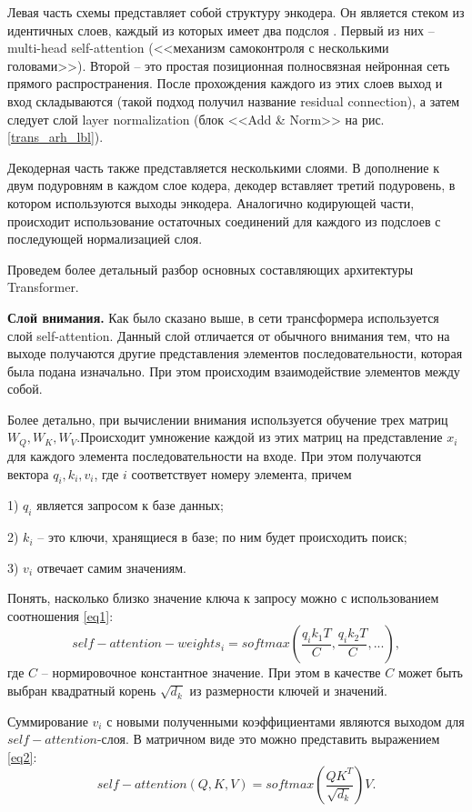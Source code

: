 \documentclass[14pt,a4paper]{extarticle}
\begin{document}
Левая часть схемы представляет собой структуру энкодера. Он является стеком из идентичных слоев, каждый из которых имеет два подслоя \cite{transform}. Первый из них --  multi-head self-attention (<<механизм самоконтроля с несколькими головами>>). Второй -- это простая позиционная полносвязная нейронная сеть прямого распространения. После прохождения каждого из этих слоев выход и вход складываются (такой подход получил название residual connection), а затем следует слой layer normalization (блок <<Add \& Norm>> на рис. \ref{trans_arh_lbl}).

Декодерная часть также представляется несколькими слоями. В дополнение к двум
подуровням в каждом слое кодера, декодер вставляет третий подуровень, в котором используются выходы энкодера. Аналогично кодирующей части, происходит использование остаточных соединений
для каждого из подслоев с последующей нормализацией слоя. 

Проведем более детальный разбор основных составляющих архитектуры Transformer.

\textbf{Слой внимания.} Как было сказано выше, в сети трансформера используется слой self-attention\cite{Attention}. Данный слой отличается от обычного внимания тем, что на выходе получаются другие представления элементов последовательности, которая была подана изначально. При этом происходим взаимодействие элементов между собой.

Более детально, при вычислении внимания используется обучение трех матриц $W_Q, W_K, W_V$.Происходит умножение каждой из этих матриц на представление $x_i$ для каждого элемента последовательности на входе. При этом получаются вектора $q_i, k_i, v_i$, где $i$ соответствует номеру элемента, причем 

1) $q_i$ является запросом к базе данных;

2) $k_i$ -- это ключи, хранящиеся в базе; по ним будет происходить поиск;

3) $v_i$ отвечает самим значениям.

Понять, насколько близко значение ключа к запросу можно с использованием соотношения \ref{eq1}:
\begin{equation}
self-attention-weights_i = softmax\left(\dfrac{q_i k_1 T}{C}, \dfrac{q_i k_2 T}{C}, ... \right), \label{eq1}
\end{equation} 
где $C$ -- нормировочное константное значение. При этом в качестве $C$ может быть выбран квадратный корень $\sqrt{d_k}$ из размерности ключей и значений. 

Суммирование $v_i$ с новыми полученными коэффициентами являются выходом для $self-attention$-слоя. В матричном виде это можно представить выражением \ref{eq2}: 
\begin{equation}
self-attention(Q, K, V) = softmax\left(\dfrac{QK^T}{\sqrt{d_k}} \right)V.\label{eq2}
\end{equation}
\end{document}
